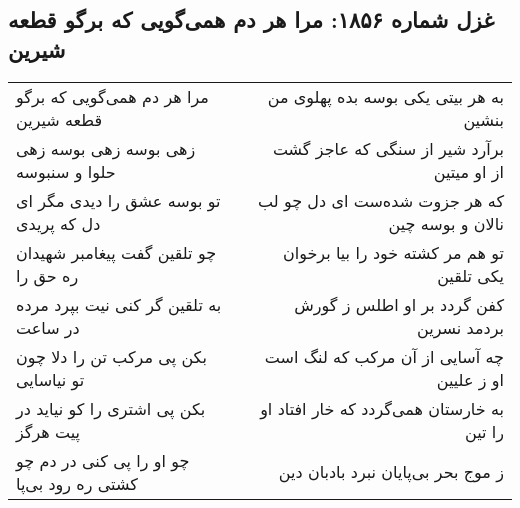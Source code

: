 \begin{center}
\section*{غزل شماره ۱۸۵۶: مرا هر دم همی‌گویی که برگو قطعه شیرین}
\label{sec:1856}
\begin{longtable}{l p{0.5cm} r}
مرا هر دم همی‌گویی که برگو قطعه شیرین
&&
به هر بیتی یکی بوسه بده پهلوی من بنشین
\\
زهی بوسه زهی بوسه زهی حلوا و سنبوسه
&&
برآرد شیر از سنگی که عاجز گشت از او میتین
\\
تو بوسه عشق را دیدی مگر ای دل که پریدی
&&
که هر جزوت شده‌ست ای دل چو لب نالان و بوسه چین
\\
چو تلقین گفت پیغامبر شهیدان ره حق را
&&
تو هم مر کشته خود را بیا برخوان یکی تلقین
\\
به تلقین گر کنی نیت بپرد مرده در ساعت
&&
کفن گردد بر او اطلس ز گورش بردمد نسرین
\\
بکن پی مرکب تن را دلا چون تو نیاسایی
&&
چه آسایی از آن مرکب که لنگ است او ز علیین
\\
بکن پی اشتری را کو نیاید در پیت هرگز
&&
به خارستان همی‌گردد که خار افتاد او را تین
\\
چو او را پی کنی در دم چو کشتی ره رود بی‌پا
&&
ز موج بحر بی‌پایان نبرد بادبان دین
\\
\end{longtable}
\end{center}
